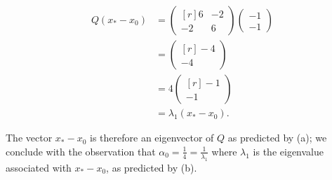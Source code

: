 \begin{solution}
    \begin{align*}
        Q(x_* - x_0) &= \begin{pmatrix*}[r]
                            6 & -2 \\
                            -2 &  6
                        \end{pmatrix*} \begin{pmatrix*}
                            -1 \\
                            -1
                        \end{pmatrix*} \\
                     &= \begin{pmatrix*}[r]
                            -4 \\
                            -4
                        \end{pmatrix*} \\
                     &= 4 \begin{pmatrix*}[r]
                            -1 \\
                            -1
                        \end{pmatrix*} \\
                     &= \lambda_1 (x_* - x_0).
    \end{align*}

    The vector $x_* - x_0$ is therefore an eigenvector of $Q$ as predicted by (a); we conclude with the observation that
    $\alpha_0 = \frac{1}{4} = \frac{1}{\lambda_1}$ where $\lambda_1$ is the eigenvalue associated with $x_* - x_0$, as 
    predicted by (b).
    \ \\
\end{solution}
